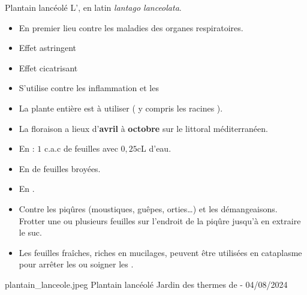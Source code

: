 
\ficheidentiteplante
{Plantain lancéolé}
{%
    L', en latin \textit{lantago lanceolata}.
}
{%
    \begin{itemize}[label = \bcplume]
        \item En premier lieu contre les maladies des organes respiratoires.
        \item Effet astringent
        \item Effet cicatrisant
        \item S'utilise contre les inflammation et les 
    \end{itemize}
}
{%
    \begin{itemize}[label = \bcplume]
        \item La plante entière est à utiliser ( y compris les racines ).
        \item La floraison a lieux d'\textbf{avril} à \textbf{octobre} sur le littoral méditerranéen.
    \end{itemize}
}
{%
    \begin{itemize}[label = \bccrayon]
        \item En  : $1$ c.a.c de feuilles avec $0{,}25$cL d'eau.
        \item En  de feuilles broyées.
        \item En .
        \item Contre les piqûres (moustiques, guêpes, orties…) et les démangeaisons.\\
                Frotter une ou plusieurs feuilles sur l’endroit de la piqûre jusqu’à en extraire le suc.
        \item Les feuilles fraîches, riches en mucilages, peuvent être utilisées en cataplasme pour arrêter les  ou soigner les .
    \end{itemize}
}
{%

}
{%
    plantain_lanceole.jpeg
}
{%
    Plantain lancéolé
}
{%
    Jardin des thermes de  - 04/08/2024
}

